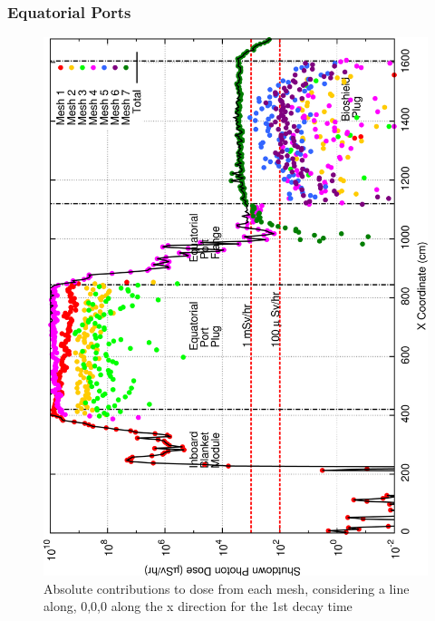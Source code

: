 \documentclass[12pt]{article}
\begin{document}
\subsubsection*{Equatorial Ports}
\label{appendix:pt_ct_base}
\begin{figure}[ht!]
\centering
\includegraphics[clip,scale=0.25]{../plots/crosstalk/nob4c/ep/dc1.png}
\caption{Absolute contributions to dose from each mesh, considering a line along, 0,0,0 along the x direction for the 1st decay time}
\label{fig:ct_ep_dc1}
\end{figure}
\end{document}
